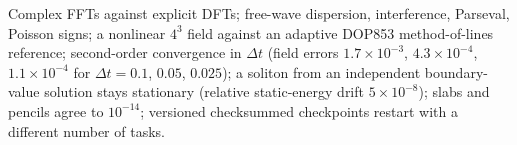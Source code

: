 \begin{validation}
Complex FFTs against explicit DFTs; free-wave dispersion, interference, Parseval, Poisson signs; a nonlinear $4^3$
field against an adaptive DOP853 method-of-lines reference; second-order convergence in $\Delta t$ (field errors
$1.7\times10^{-3}$, $4.3\times10^{-4}$, $1.1\times10^{-4}$ for $\Delta t=0.1$, $0.05$, $0.025$); a soliton from an
independent boundary-value solution stays stationary (relative static-energy drift $5\times10^{-8}$); slabs and
pencils agree to $10^{-14}$; versioned checksummed checkpoints restart with a different number of tasks.
\end{validation}
